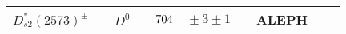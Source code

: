 {\begin{tabular}{cp{5pt}cp{5pt}r@{}lp{5pt}cp{5pt}c}
		\multirow{1}{*}{$D_{s2}^{*}(2573)^{\pm}$}       &   & $D^{0}$                                      & \cellcolor{LightGray} & $	\cellcolor{LightGray} 704$ & \cellcolor{LightGray}${}\pm3\pm1	$             & \cellcolor{LightGray} & \cellcolor{LightGray}ALEPH    & \cellcolor{LightGray} & \cite{Heister:2001nj}   \\ \bottomrule
	\end{tabular}}
